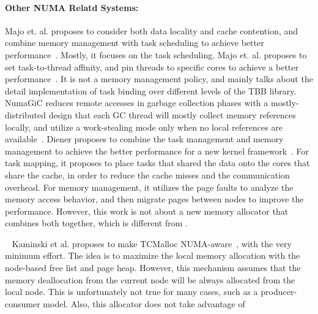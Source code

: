 \paragraph{Other NUMA Relatd Systems:} 
Majo et. al. proposes to consider both data locality and cache contention, and combine memory management with task scheduling to achieve better performance~\cite{Majo:2011:MMN:1993478.1993481}. Mostly, it focuses on the task scheduling.  Majo et. al. proposes to set task-to-thread affinity, and pin threads to specific cores to achieve a better performance~\cite{Majo:2015:LPC:2688500.2688509}. It is not a memory management policy, and mainly talks about the detail implementation of task binding over different levels of the TBB library. NumaGiC reduces remote accesses in garbage collection phases with a mostly-distributed design that each GC thread will mostly collect memory references locally, and utilize a work-stealing mode only when no local references are available~\cite{NumaGiC}.  Diener proposes to combine the task management and memory management to achieve the better performance for a new kernel framework~\cite{diener2015automatic}. For task mapping, it proposes to place tasks that shared the data onto the cores that share the cache, in order to reduce the cache misses and the communication overhead. For memory management, it utilizes the page faults to analyze the memory access behavior, and then migrate pages between nodes to improve the performance. However, this work is not about a new memory allocator that combines both together, which is different from \NM{}. 


 
~\cite{1419934}
Kaminski et al. proposes to make TCMalloc NUMA-aware~\cite{tcmallocnew}, with the very minimum effort. The idea is to maximize the local memory allocation with the node-based free list and page heap. However, this mechanism assumes that the memory deallocation from the current node will be always allocated from the local node. This is unfortunately not true for many cases, such as a producer-consumer model. Also, this allocator does not take advantage of 


 

